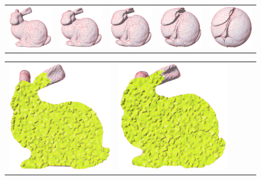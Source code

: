 \documentclass[runningheads]{llncs}
\begin{document}
{ \setlength{\tabcolsep}{0pt}
\begin{figure}[!htbp]
\centering
\begin{tabular}{ccccc}
\includegraphics[height=0.2\textwidth]{./figs/bunny_bruno_morph/a.png}&
\includegraphics[height=0.2\textwidth]{./figs/bunny_bruno_morph/b.png}&
\includegraphics[height=0.2\textwidth]{./figs/bunny_bruno_morph/c.png}&
\includegraphics[height=0.2\textwidth]{./figs/bunny_bruno_morph/d.png}&
\includegraphics[height=0.2\textwidth]{./figs/bunny_bruno_morph/e.png}\\
\end{tabular}
\begin{tabular}{ccccc}
\includegraphics[height=0.2\textwidth]{./figs/bunny_bruno_morph/f.png}&
\includegraphics[height=0.2\textwidth]{./figs/bunny_bruno_morph/g.png}&

\end{tabular}
\end{figure}}
\end{document}
